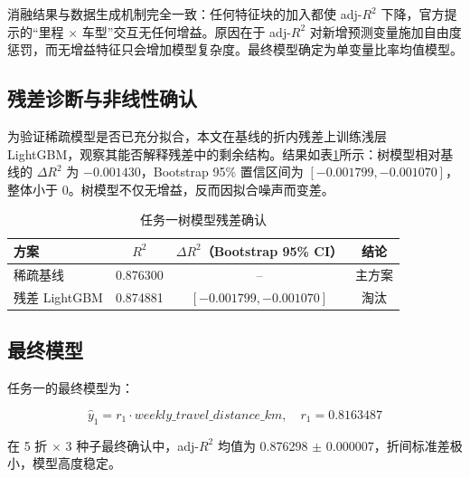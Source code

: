 消融结果与数据生成机制完全一致：任何特征块的加入都使 adj-$R^2$ 下降，官方提示的``里程 $\times$ 车型''交互无任何增益。原因在于 adj-$R^2$ 对新增预测变量施加自由度惩罚，而无增益特征只会增加模型复杂度。最终模型确定为单变量比率均值模型。

\subsection{残差诊断与非线性确认}

为验证稀疏模型是否已充分拟合，本文在基线的折内残差上训练浅层 LightGBM，观察其能否解释残差中的剩余结构。结果如表\ref{tab:t1_tree}所示：树模型相对基线的 $\Delta R^2$ 为 $-0.001430$，Bootstrap 95\% 置信区间为 $[-0.001799, -0.001070]$，整体小于 0。树模型不仅无增益，反而因拟合噪声而变差。

\begin{table}[H]
\centering
\caption{任务一树模型残差确认}
\label{tab:t1_tree}
\begin{tabular}{lccc}
\toprule
\textbf{方案} & \textbf{$R^2$} & \textbf{$\Delta R^2$（Bootstrap 95\% CI）} & \textbf{结论} \\
\midrule
稀疏基线 & 0.876300 & -- & 主方案 \\
残差 LightGBM & 0.874881 & $[-0.001799, -0.001070]$ & 淘汰 \\
\bottomrule
\end{tabular}
\end{table}

\subsection{最终模型}

任务一的最终模型为：

\begin{equation}
\hat{y}_1 = r_1 \cdot weekly\_travel\_distance\_km, \quad r_1 = 0.8163487
\label{eq:t1}
\end{equation}

在 5 折 $\times$ 3 种子最终确认中，adj-$R^2$ 均值为 0.876298 $\pm$ 0.000007，折间标准差极小，模型高度稳定。
